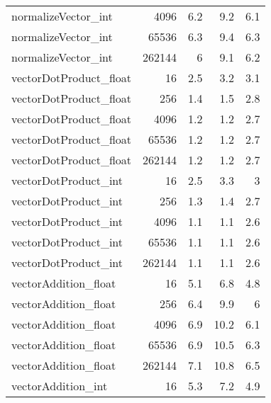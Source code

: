 \begin{tabular}{lrrrr}
 normalizeVector\_int    &   4096 &                 6.2 &               9.2 &                 6.1 \\
 normalizeVector\_int    &  65536 &                 6.3 &               9.4 &                 6.3 \\
 normalizeVector\_int    & 262144 &                 6   &               9.1 &                 6.2 \\
 vectorDotProduct\_float &     16 &                 2.5 &               3.2 &                 3.1 \\
 vectorDotProduct\_float &    256 &                 1.4 &               1.5 &                 2.8 \\
 vectorDotProduct\_float &   4096 &                 1.2 &               1.2 &                 2.7 \\
 vectorDotProduct\_float &  65536 &                 1.2 &               1.2 &                 2.7 \\
 vectorDotProduct\_float & 262144 &                 1.2 &               1.2 &                 2.7 \\
 vectorDotProduct\_int   &     16 &                 2.5 &               3.3 &                 3   \\
 vectorDotProduct\_int   &    256 &                 1.3 &               1.4 &                 2.7 \\
 vectorDotProduct\_int   &   4096 &                 1.1 &               1.1 &                 2.6 \\
 vectorDotProduct\_int   &  65536 &                 1.1 &               1.1 &                 2.6 \\
 vectorDotProduct\_int   & 262144 &                 1.1 &               1.1 &                 2.6 \\
 vectorAddition\_float   &     16 &                 5.1 &               6.8 &                 4.8 \\
 vectorAddition\_float   &    256 &                 6.4 &               9.9 &                 6   \\
 vectorAddition\_float   &   4096 &                 6.9 &              10.2 &                 6.1 \\
 vectorAddition\_float   &  65536 &                 6.9 &              10.5 &                 6.3 \\
 vectorAddition\_float   & 262144 &                 7.1 &              10.8 &                 6.5 \\
 vectorAddition\_int     &     16 &                 5.3 &               7.2 &                 4.9 \\

\end{tabular}

